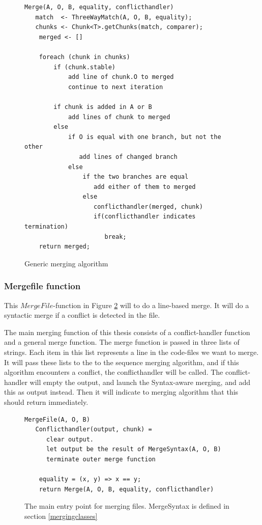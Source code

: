 \documentclass[11pt]{article}
\begin{document}
\begin{figure}
\begin{verbatim}
Merge(A, O, B, equality, conflicthandler)
   match  <- ThreeWayMatch(A, O, B, equality);
   chunks <- Chunk<T>.getChunks(match, comparer);
    merged <- []

    foreach (chunk in chunks)
        if (chunk.stable)
            add line of chunk.O to merged
            continue to next iteration

        if chunk is added in A or B
            add lines of chunk to merged
        else
            if O is equal with one branch, but not the other
               add lines of changed branch
            else
                if the two branches are equal
                   add either of them to merged
                else
                   conflicthandler(merged, chunk)
                   if(conflicthandler indicates termination)
                      break;
    return merged;
\end{verbatim}
\caption{Generic merging algorithm}
  \label{Genericmergingalgorithm}
\end{figure}

\subsubsection{Mergefile function}
This $MergeFile$-function in Figure \ref{Mainmerge} will to do a line-based merge. It will do a syntactic merge if a conflict is detected in the file.

The main merging function of this thesis consists of a conflict-handler function and a general merge function. The merge function is passed in three lists of strings. Each item in this list represents a line in the code-files we want to merge. It will pass these lists to the to the sequence merging algorithm, and if this algorithm encounters a conflict, the conflicthandler will be called. The conflict-handler will empty the output, and launch the Syntax-aware merging, and add this as output instead. Then it will indicate to merging algorithm that this should return immediately.


\begin{figure}
\begin{verbatim}
MergeFile(A, O, B)
   Conflicthandler(output, chunk) = 
      clear output.
      let output be the result of MergeSyntax(A, O, B)
      terminate outer merge function

    equality = (x, y) => x == y;
    return Merge(A, O, B, equality, conflicthandler)
\end{verbatim}
\caption{The main entry point for merging files. MergeSyntax is defined in section \ref{mergingclasses}}
  \label{Mainmerge}
\end{figure}
\end{document}
